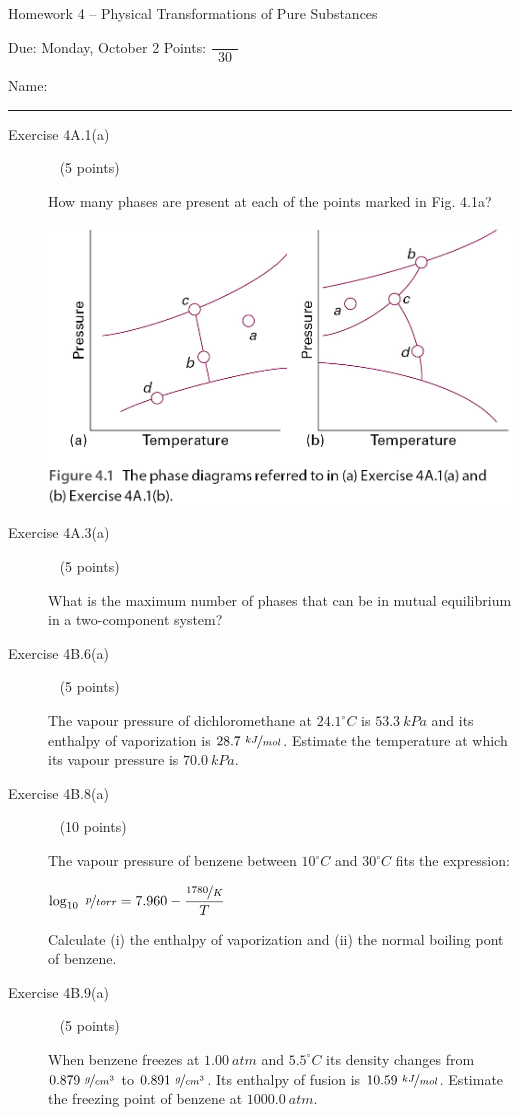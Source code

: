 \documentclass[12pt, openany, letterpaper]{memoir}
\begin{document}
\begin{center}
	{\large Homework 4 -- Physical Transformations of Pure Substances}
	
	Due: Monday, October 2 \hspace{3em} Points: ${\dfrac{~}{~~30~~}}$
\end{center}

Name: \rule[-.1mm]{15em}{0.1pt}

\begin{description}	
	\item [Exercise 4A.1(a)] ~ (5 points)
	
	How many phases are present at each of the points marked in Fig. 4.1a?
	
	\noindent\includegraphics[width=0.5\linewidth]{Phase_Diagrams}
	\item [Exercise 4A.3(a)] ~ (5 points)
	
	What is the maximum number of phases that can be in mutual equilibrium in a two-component system?
	
	\vspace{10em}
	\item [Exercise 4B.6(a)] ~ (5 points)
	
	The vapour pressure of dichloromethane at $24.1^\circ C$ is $53.3~kPa$ and its enthalpy of vaporization is $28.7~\nicefrac{kJ}{mol}$. Estimate the temperature at which its vapour pressure is $70.0~kPa$.
	

	
	\vspace{10em}
	\item [Exercise 4B.8(a)] ~ (10 points)
	
	The vapour pressure of benzene between $10^\circ C$ and $30^\circ C$ fits the expression:
	
	 $\log_{10}~\nicefrac{p}{torr} = 7.960-\dfrac{\nicefrac{1780}{K}}{T}$ 
	 
	 Calculate (i) the enthalpy of vaporization and (ii) the normal boiling pont of benzene.
	
	\vspace{20em}
	\item [Exercise 4B.9(a)] ~ (5 points)
	
	When benzene freezes at $1.00~atm$ and $5.5^\circ C$ its density changes from $0.879~\nicefrac{g}{cm^3}$ to $0.891~\nicefrac{g}{cm^3}$. Its enthalpy of fusion is $10.59~\nicefrac{kJ}{mol}$. Estimate the freezing point of benzene at $1000.0~atm$.
	
	\vspace{15em}	
\end{description}
\end{document}
